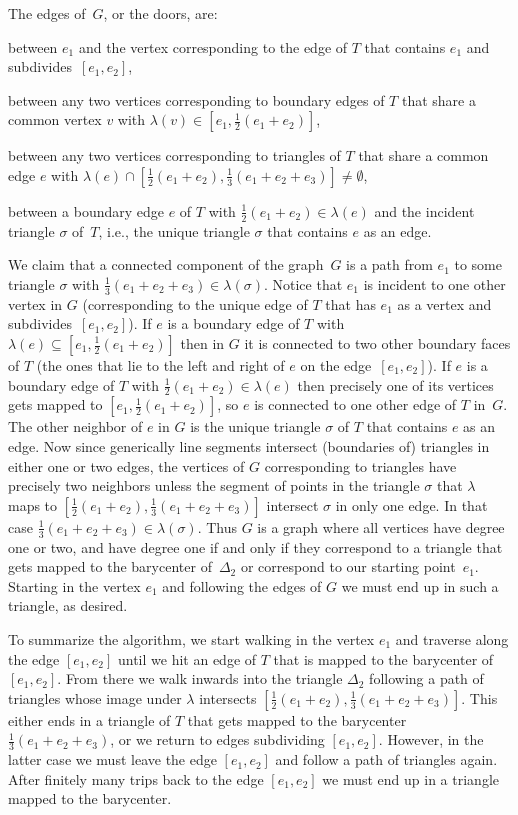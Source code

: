 \documentclass[a4paper,10pt,reqno, english]{amsart}
\theoremstyle{plain}
\theoremstyle{definition}
\begin{document}
The edges of~$G$, or the doors, are:
\begin{compactitem}
	\item between $e_1$ and the vertex corresponding to the edge of $T$ that contains $e_1$ and subdivides~$[e_1,e_2]$,
	\item between any two vertices corresponding to boundary edges of $T$ that share a common vertex $v$ with $\lambda(v) \in [e_1, \frac12(e_1+e_2)]$,
	\item between any two vertices corresponding to triangles of $T$ that share a common edge $e$ with 
	$\lambda(e) \cap[\frac12(e_1+e_2), \frac13(e_1+e_2+e_3)]\ne \emptyset$,
	\item between a boundary edge $e$ of $T$ with $\frac12(e_1+e_2) \in \lambda(e)$ and the incident triangle $\sigma$ of~$T$, i.e., the unique triangle $\sigma$
	that contains $e$ as an edge.
\end{compactitem}

We claim that a connected component of the graph~$G$ is a path from $e_1$ to some triangle $\sigma$ with $\frac13(e_1+e_2+e_3) \in \lambda(\sigma)$.
Notice that $e_1$ is incident to one other vertex in $G$ (corresponding to the unique edge of $T$ that has $e_1$ as a vertex and
subdivides~$[e_1,e_2]$). If $e$ is a boundary edge of $T$ with $\lambda(e) \subseteq [e_1, \frac12(e_1+e_2)]$ then in $G$ it is connected to 
two other boundary faces of $T$ (the ones that lie to the left and right of $e$ on the edge~$[e_1,e_2]$). If $e$ is a boundary edge of $T$ with $\frac12(e_1+e_2) \in \lambda(e)$
then precisely one of its vertices gets mapped to $[e_1, \frac12(e_1+e_2)]$, so $e$ is connected to one other edge of $T$ in~$G$. The other
neighbor of $e$ in $G$ is the unique triangle $\sigma$ of $T$ that contains $e$ as an edge. Now since generically line segments intersect
(boundaries of) triangles in either one or two edges, the vertices of $G$ corresponding to triangles have precisely two neighbors unless
the segment of points in the triangle $\sigma$ that $\lambda$ maps to $[\frac12(e_1+e_2), \frac13(e_1+e_2+e_3)]$ intersect $\sigma$ in
only one edge. In that case $\frac13(e_1+e_2+e_3) \in \lambda(\sigma)$. Thus $G$ is a graph where all vertices 
have degree one or two, and have degree one if and only if they correspond to a triangle that gets mapped to the barycenter of~$\Delta_2$ or correspond to our starting point~$e_1$.
Starting in the vertex $e_1$ and following the edges of $G$ we must end up in such a triangle, as desired.

To summarize the algorithm, we start walking in the vertex $e_1$ and traverse along the edge $[e_1,e_2]$ until we hit an edge of $T$ that is
mapped to the barycenter of $[e_1,e_2]$. From there we walk inwards into the triangle $\Delta_2$ following a path of triangles whose image
under $\lambda$ intersects $[\frac12(e_1+e_2), \frac13(e_1+e_2+e_3)]$. This either ends in a triangle of $T$ that gets mapped to the barycenter
$\frac13(e_1+e_2+e_3)$, or we return to edges subdividing $[e_1,e_2]$. However, in the latter case we must leave the edge $[e_1,e_2]$
and follow a path of triangles again. After finitely many trips back to the edge $[e_1,e_2]$ we must end up in a triangle mapped to the barycenter.
\end{document}
